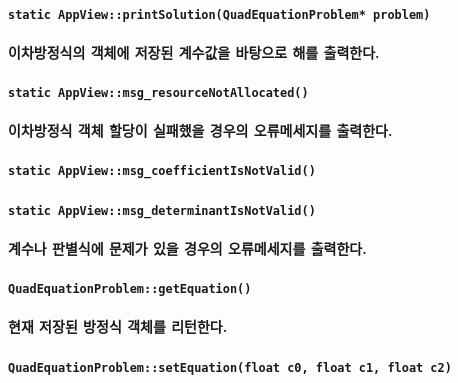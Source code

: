 \documentclass[UTF8]{report}
\begin{document}
            \paragraph{\texttt{static AppView::printSolution(QuadEquationProblem* problem)}}
            \paragraph{%
                \normalfont 이차방정식의 객체에 저장된 계수값을 바탕으로 해를 출력한다.
            }
            
            \paragraph{\texttt{static AppView::msg\_resourceNotAllocated()}}
            \paragraph{%
                \normalfont 이차방정식 객체 할당이 실패했을 경우의 오류메세지를 출력한다.
            }

            \paragraph{\texttt{static AppView::msg\_coefficientIsNotValid()}}
            \paragraph{\texttt{static AppView::msg\_determinantIsNotValid()}}
            \paragraph{%
                \normalfont 계수나 판별식에 문제가 있을 경우의 오류메세지를 출력한다.
            }

            \paragraph{\texttt{QuadEquationProblem::getEquation()}}
            \paragraph{%
                \normalfont 현재 저장된 방정식 객체를 리턴한다.
            }
            
            \paragraph{\texttt{QuadEquationProblem::setEquation(float c0, float c1, float c2)}}
\end{document}
